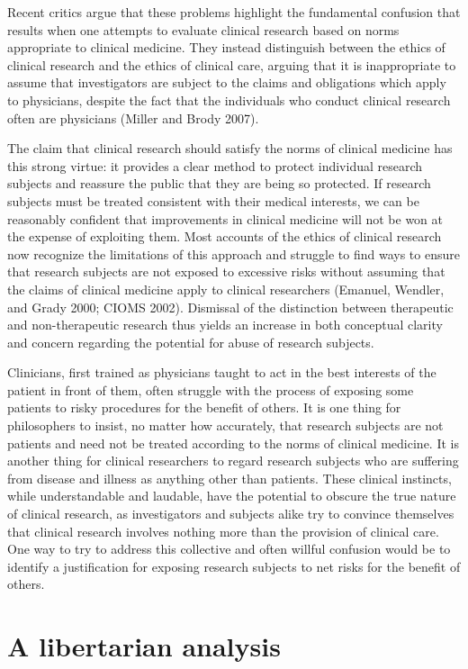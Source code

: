 \documentclass[12p]{article}
\begin{document}
Recent critics argue that these problems highlight the fundamental confusion that results when one attempts to evaluate clinical research based on norms appropriate to clinical medicine. They instead distinguish between the ethics of clinical research and the ethics of clinical care, arguing that it is inappropriate to assume that investigators are subject to the claims and obligations which apply to physicians, despite the fact that the individuals who conduct clinical research often are physicians (Miller and Brody 2007).

The claim that clinical research should satisfy the norms of clinical medicine has this strong virtue: it provides a clear method to protect individual research subjects and reassure the public that they are being so protected. If research subjects must be treated consistent with their medical interests, we can be reasonably confident that improvements in clinical medicine will not be won at the expense of exploiting them. Most accounts of the ethics of clinical research now recognize the limitations of this approach and struggle to find ways to ensure that research subjects are not exposed to excessive risks without assuming that the claims of clinical medicine apply to clinical researchers (Emanuel, Wendler, and Grady 2000; CIOMS 2002). Dismissal of the distinction between therapeutic and non-therapeutic research thus yields an increase in both conceptual clarity and concern regarding the potential for abuse of research subjects.

Clinicians, first trained as physicians taught to act in the best interests of the patient in front of them, often struggle with the process of exposing some patients to risky procedures for the benefit of others. It is one thing for philosophers to insist, no matter how accurately, that research subjects are not patients and need not be treated according to the norms of clinical medicine. It is another thing for clinical researchers to regard research subjects who are suffering from disease and illness as anything other than patients. These clinical instincts, while understandable and laudable, have the potential to obscure the true nature of clinical research, as investigators and subjects alike try to convince themselves that clinical research involves nothing more than the provision of clinical care. One way to try to address this collective and often willful confusion would be to identify a justification for exposing research subjects to net risks for the benefit of others. 

\section{A libertarian analysis}
\end{document}

